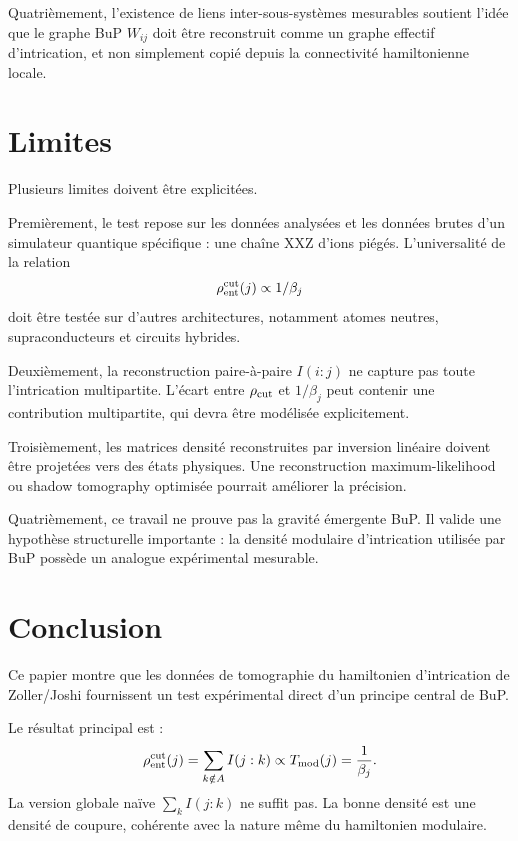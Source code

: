 \documentclass[11pt,a4paper]{article}
\begin{document}
Quatrièmement, l'existence de liens inter-sous-systèmes mesurables soutient l'idée que le graphe BuP $W_{ij}$ doit être reconstruit comme un graphe effectif d'intrication, et non simplement copié depuis la connectivité hamiltonienne locale.

\section{Limites}

Plusieurs limites doivent être explicitées.

Premièrement, le test repose sur les données analysées et les données brutes d'un simulateur quantique spécifique : une chaîne XXZ d'ions piégés. L'universalité de la relation
\[
\rho_{\rm ent}^{\rm cut}(j)
\propto
1/\beta_j
\]
doit être testée sur d'autres architectures, notamment atomes neutres, supraconducteurs et circuits hybrides.

Deuxièmement, la reconstruction paire-à-paire $I(i:j)$ ne capture pas toute l'intrication multipartite. L'écart entre $\rho_{\rm cut}$ et $1/\beta_j$ peut contenir une contribution multipartite, qui devra être modélisée explicitement.

Troisièmement, les matrices densité reconstruites par inversion linéaire doivent être projetées vers des états physiques. Une reconstruction maximum-likelihood ou shadow tomography optimisée pourrait améliorer la précision.

Quatrièmement, ce travail ne prouve pas la gravité émergente BuP. Il valide une hypothèse structurelle importante : la densité modulaire d'intrication utilisée par BuP possède un analogue expérimental mesurable.

\section{Conclusion}

Ce papier montre que les données de tomographie du hamiltonien d'intrication de Zoller/Joshi fournissent un test expérimental direct d'un principe central de BuP.

Le résultat principal est :
\[
\rho_{\rm ent}^{\rm cut}(j)
=
\sum_{k\notin A}I(j:k)
\propto
T_{\rm mod}(j)
=
\frac{1}{\beta_j}.
\]
La version globale naïve $\sum_k I(j:k)$ ne suffit pas. La bonne densité est une densité de coupure, cohérente avec la nature même du hamiltonien modulaire.
\end{document}

